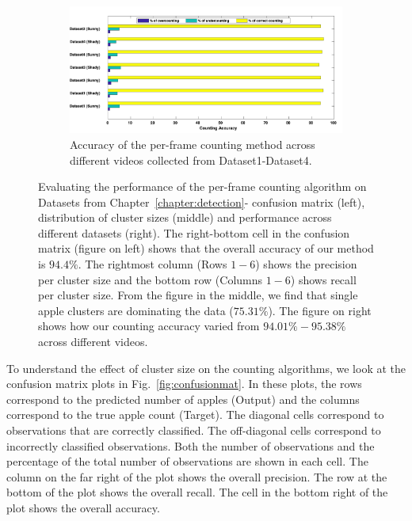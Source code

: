 \begin{figure}[!hbpt]
\begin{subfigure}[b]{\textwidth}
\begin{subfigure}[b]{.40\textwidth}
                     \label{fig:clusterDist}   
        \end{subfigure}
        \end{subfigure}\\ \begin{subfigure}[b]{\textwidth}
        \includegraphics[width=\textwidth]{figures/counting/datasetcount_.pdf} 
        \caption[Per-frame accuracy of the unsupervised counting method]{Accuracy of the per-frame counting method across different videos collected from Dataset1-Dataset4.}
             \label{fig:countdatasets}
        \end{subfigure}
   \caption[Evaluation of the unsupervised fruit counting method on Datasets from Chapter~\ref{chapter:detection}.]{Evaluating the performance of the per-frame counting algorithm on Datasets from Chapter~\ref{chapter:detection}- confusion matrix (left), distribution of cluster sizes (middle) and performance across different datasets (right). The right-bottom cell in the confusion matrix (figure on left) shows that the overall accuracy of our method is $94.4\%$. The rightmost column (Rows $1-6$) shows the precision per cluster size and the bottom row (Columns $1-6$) shows recall per cluster size. From the figure in the middle, we find that single apple clusters are dominating the data ($75.31\%$). The figure on right shows how our counting accuracy varied from $94.01\% - 95.38\%$ across different videos.}
   \label{fig:analysis}
\end{figure}    

To understand the effect of cluster size on the counting algorithms, we look at the confusion matrix plots in Fig.~\ref{fig:confusionmat}. In these plots, the rows correspond to the predicted number of apples (Output) and the columns correspond to the true apple count (Target). The diagonal cells correspond to observations that are correctly classified. The off-diagonal cells correspond to incorrectly classified observations. Both the number of observations and the percentage of the total number of observations are shown in each cell. The column on the far right of the plot shows the overall precision. The row at the bottom of the plot shows the overall recall. The cell in the bottom right of the plot shows the overall accuracy.

